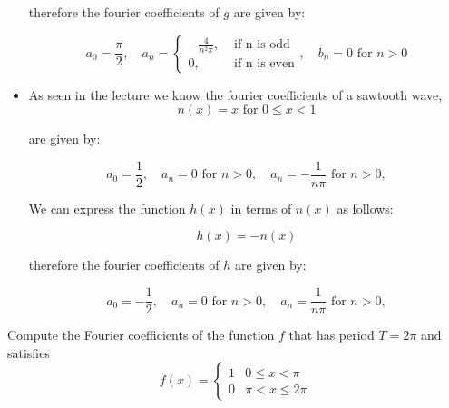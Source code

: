\documentclass[11pt]{article}
\begin{document}
\begin{solution}
\begin{itemize}
    therefore the fourier coefficients of $g$ are given by:

    $$
    a_0 = \frac{\pi}{2}, \quad a_n = \begin{cases}-\frac{4}{n^2\pi}, & \text { if n is odd} \\ 0, & \text{ if n is even}\end{cases}, \quad b_n = 0 \text{ for } n > 0
    $$
    \item As seen in the lecture we know the fourier coefficients of a sawtooth wave,
    $$
    n(x)=x \text { for } 0 \leq x<1
    $$

    are given by:

    $$
    a_0 = \frac{1}{2}, \quad a_n = 0 \text{ for } n > 0,  \quad a_n = -\frac{1}{n\pi} \text{ for } n > 0,
    $$

    We can express the function $h(x)$ in terms of $n(x)$ as follows:

    $$
    h(x) = -n(x)
    $$

    therefore the fourier coefficients of $h$ are given by:

    $$
    a_0 = -\frac{1}{2}, \quad a_n = 0 \text{ for } n > 0,  \quad a_n = \frac{1}{n\pi} \text{ for } n > 0,
    $$
    \end{itemize}
\end{solution}



\begin{exercise}
    Compute the Fourier coefficients of the function $f$ that has period $T = 2\pi$ and satisfies
    \[
        f(x) = \left\{\begin{array}{ll} 1 & 0 \leq x < \pi \\ 0 & \pi < x \leq 2\pi \end{array}\right.
    \]
\end{exercise}
\begin{solution}
\end{solution}
\end{document}
